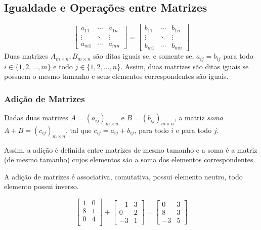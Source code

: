 \subsection{Igualdade e Operações entre Matrizes}
\[\begin{bmatrix}
a_{11}&\cdots&a_{1n}\\
\vdots&\ddots&\vdots\\
a_{m1}&\cdots&a_{mn}
\end{bmatrix}=\begin{bmatrix}
b_{11}&\cdots&b_{1n}\\
\vdots&\ddots&\vdots\\
b_{m1}&\cdots&b_{mn}
\end{bmatrix}\] Duas matrizes $A_{m\times n},B_{m \times n}$ são ditas iguais se, e somente se, $a_{ij}=b_{ij}$ para todo $i\in \{1,2,\dots,m\}$ e todo $j\in\{1,2,\dots,n\}$. Assim, duas matrizes são ditas iguais se possuem o mesmo tamanho e seus elementos correspondentes são iguais.
\subsubsection{Adição de Matrizes}
\begin{df}
Dadas duas matrizes $A=(a_{ij})_{m \times n}$ e $B=(b_{ij})_{m\times n}$, a matriz \emph{soma} $A+B=(c_{ij})_{m\times n}$, tal que $c_{ij}=a_{ij}+b_{ij}$, para todo $i$ e para todo $j$.
\end{df}
 Assim, a adição é definida entre matrizes de mesmo tamanho e a soma é a matriz (de mesmo tamanho) cujos elementos são a soma dos elementos correspondentes.\par 
A adição de matrizes é associativa, comutativa, possui elemento neutro, todo elemento possui inverso.
\begin{exemplo}
\[\begin{bmatrix}
1 & 0 \\
8 & 1 \\
0 & 4 \\
\end{bmatrix}+\begin{bmatrix}
-1 & 3 \\
0 & 2 \\
-3 & 1
\end{bmatrix}=\begin{bmatrix}
0 & 3 \\
8 & 3 \\
-3 & 5
\end{bmatrix}\]
\end{exemplo}
